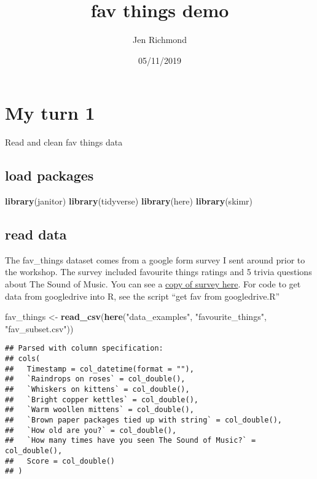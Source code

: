 \documentclass[]{article}
\title{fav things demo}
\author{Jen Richmond}
\date{05/11/2019}
\newenvironment{Shaded}{\begin{snugshade}}{\end{snugshade}}
\newcommand{\KeywordTok}[1]{\textcolor[rgb]{0.13,0.29,0.53}{\textbf{#1}}}
\newcommand{\NormalTok}[1]{#1}
\newcommand{\StringTok}[1]{\textcolor[rgb]{0.31,0.60,0.02}{#1}}
\begin{document}
\maketitle

\hypertarget{my-turn-1}{%
\section{My turn 1}\label{my-turn-1}}

Read and clean fav things data

\hypertarget{load-packages}{%
\subsection{load packages}\label{load-packages}}

\begin{Shaded}
\begin{Highlighting}[]
\KeywordTok{library}\NormalTok{(janitor)}
\KeywordTok{library}\NormalTok{(tidyverse)}
\KeywordTok{library}\NormalTok{(here)}
\KeywordTok{library}\NormalTok{(skimr)}
\end{Highlighting}
\end{Shaded}

\hypertarget{read-data}{%
\subsection{read data}\label{read-data}}

The fav\_things dataset comes from a google form survey I sent around
prior to the workshop. The survey included favourite things ratings and
5 trivia questions about The Sound of Music. You can see a
\href{https://forms.gle/XAhDG1JfAoAnd9G37}{copy of survey here}. For
code to get data from googledrive into R, see the script ``get fav from
googledrive.R''

\begin{Shaded}
\begin{Highlighting}[]
\NormalTok{fav_things <-}\StringTok{ }\KeywordTok{read_csv}\NormalTok{(}\KeywordTok{here}\NormalTok{(}\StringTok{"data_examples"}\NormalTok{, }\StringTok{"favourite_things"}\NormalTok{, }\StringTok{"fav_subset.csv"}\NormalTok{))}
\end{Highlighting}
\end{Shaded}

\begin{verbatim}
## Parsed with column specification:
## cols(
##   Timestamp = col_datetime(format = ""),
##   `Raindrops on roses` = col_double(),
##   `Whiskers on kittens` = col_double(),
##   `Bright copper kettles` = col_double(),
##   `Warm woollen mittens` = col_double(),
##   `Brown paper packages tied up with string` = col_double(),
##   `How old are you?` = col_double(),
##   `How many times have you seen The Sound of Music?` = col_double(),
##   Score = col_double()
## )
\end{verbatim}
\end{document}
